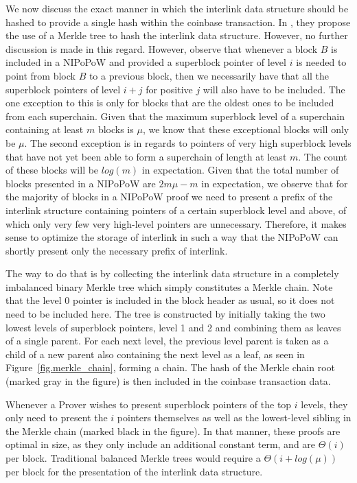 We now discuss the exact manner in which the interlink data structure should be
hashed to provide a single hash within the coinbase transaction. In \cite{KLS},
they propose the use of a Merkle tree to hash the interlink data structure.
However, no further discussion is made in this regard. However, observe that
whenever a block $B$ is included in a NIPoPoW and provided a superblock pointer
of level $i$ is needed to point from block $B$ to a previous block, then
we necessarily have that all the superblock pointers of level $i + j$ for
positive $j$ will also have to be included. The one exception to this is only
for blocks that are the oldest ones to be included from each superchain. Given
that the maximum superblock level of a superchain containing at least $m$
blocks is $\mu$, we know that these exceptional blocks will only be $\mu$. The
second exception is in regards to pointers of very high superblock levels that
have not yet been able to form a superchain of length at least $m$. The count
of these blocks will be $log(m)$ in expectation. Given that the total number of
blocks presented in a NIPoPoW are $2m\mu - m$ in expectation, we observe that
for the majority of blocks in a NIPoPoW proof we need to present a prefix of
the interlink structure containing pointers of a certain superblock level and
above, of which only very few very high-level pointers are unnecessary.
Therefore, it makes sense to optimize the storage of interlink in such a way
that the NIPoPoW can shortly present only the necessary prefix of interlink.

The way to do that is by collecting the interlink data structure in a
completely imbalanced binary Merkle tree which simply constitutes a Merkle
chain. Note that the level 0 pointer is included in the block header as usual,
so it does not need to be included here. The tree is constructed by initially
taking the two lowest levels of superblock pointers, level 1 and 2 and
combining them as leaves of a single parent. For each next level, the previous
level parent is taken as a child of a new parent also containing the next level
as a leaf, as seen in Figure~\ref{fig.merkle_chain}, forming a chain. The hash
of the Merkle chain root (marked gray in the figure) is then included in the
coinbase transaction data.

Whenever a Prover wishes to present superblock pointers of the top $i$ levels,
they only need to present the $i$ pointers themselves as well as the
lowest-level sibling in the Merkle chain (marked black in the figure). In that
manner, these proofs are optimal in size, as they only include an additional
constant term, and are $\Theta(i)$ per block.  Traditional balanced Merkle
trees would require a $\Theta(i + log(\mu))$ per block for the presentation of
the interlink data structure.

